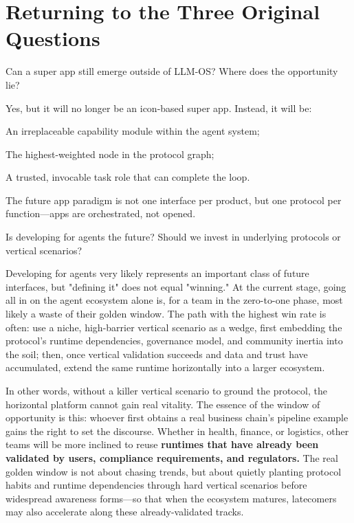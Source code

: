 \newpage
\section{Returning to the Three Original Questions}

\begin{thinkbox}
    Can a super app still emerge outside of LLM-OS? Where does the opportunity lie?
\end{thinkbox}


Yes, but it will no longer be an icon-based super app. Instead, it will be:

{\kaiti
An irreplaceable capability module within the agent system;

The highest-weighted node in the protocol graph;

A trusted, invocable task role that can complete the loop.
}

The future app paradigm is not one interface per product, but one protocol per function---apps are orchestrated, not opened.


\begin{thinkbox}
Is developing for agents the future? Should we invest in underlying protocols or vertical scenarios?
\end{thinkbox}


Developing for agents very likely represents an important class of future interfaces, but "defining it" does not equal "winning."
At the current stage, going all in on the agent ecosystem alone is, for a team in the zero-to-one phase, most likely a waste of their golden window. The path with the highest win rate is often: use a niche, high-barrier vertical scenario as a wedge, first embedding the protocol's runtime dependencies, governance model, and community inertia into the soil; then, once vertical validation succeeds and data and trust have accumulated, extend the same runtime horizontally into a larger ecosystem.

\vspace{1em}

In other words, without a killer vertical scenario to ground the protocol, the horizontal platform cannot gain real vitality. The essence of the window of opportunity is this: whoever first obtains a real business chain's pipeline example gains the right to set the discourse.
Whether in health, finance, or logistics, other teams will be more inclined to reuse \textbf{runtimes that have already been validated by users, compliance requirements, and regulators.} The real golden window is not about chasing trends, but about quietly planting protocol habits and runtime dependencies through hard vertical scenarios before widespread awareness forms---so that when the ecosystem matures, latecomers may also accelerate along these already-validated tracks.


